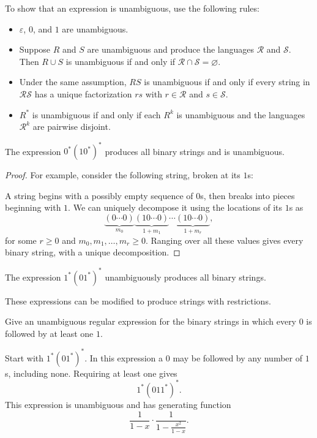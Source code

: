 To show that an expression is unambiguous, use the following rules:
\begin{itemize}
\item $\varepsilon$, $0$, and $1$ are unambiguous.
\item Suppose $R$ and $S$ are unambiguous and produce the languages $\mathcal R$ and $\mathcal S$.
Then $R\cup S$ is unambiguous if and only if $\mathcal R\cap\mathcal S=\varnothing$.
\item Under the same assumption, $RS$ is unambiguous if and only if every string in $\mathcal R\mathcal S$ has a unique factorization $rs$ with $r\in\mathcal R$ and $s\in\mathcal S$.
\item $R^*$ is unambiguous if and only if each $R^k$ is unambiguous and the languages $\mathcal R^k$ are pairwise disjoint.
\end{itemize}
\begin{lemma}
The expression $0^*(10^*)^*$ produces all binary strings and is unambiguous.
\end{lemma}
\begin{proof}
For example, consider the following string, broken at its $1$s:

A string begins with a possibly empty sequence of $0$s, then breaks into pieces beginning with $1$. We can uniquely decompose it using the locations of its $1$s as
\[
\underbrace{(0\cdots0)}_{m_0}
\underbrace{(10\cdots0)}_{1+m_1}\cdots
\underbrace{(10\cdots0)}_{1+m_r},
\]
for some $r\ge0$ and $m_0,m_1,\ldots,m_r\ge0$.
Ranging over all these values gives every binary string, with a unique decomposition.
\end{proof}
\begin{corollary}
The expression $1^*(01^*)^*$ unambiguously produces all binary strings.
\end{corollary}
These expressions can be modified to produce strings with restrictions.
\begin{example}
Give an unambiguous regular expression for the binary strings in which every $0$ is followed by at least one $1$.\par\medskip
Start with $1^*(01^*)^*$. In this expression a $0$ may be followed by any number of $1$s, including none. Requiring at least one gives
\[
1^*(011^*)^*.
\]
This expression is unambiguous and has generating function
\[
\frac1{1-x}\cdot\frac1{1-\frac{x^2}{1-x}}.
\]
\end{example}

